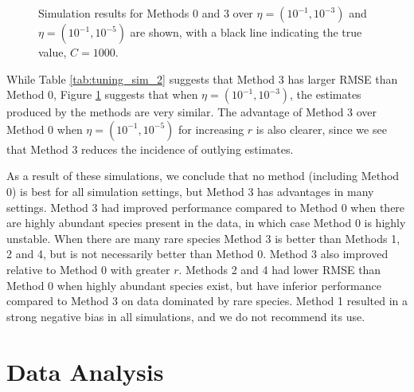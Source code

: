 \documentclass[12pt]{article}
\theoremstyle{break}
\theoremstyle{break}
\begin{document}
\begin{figure}[t]
\caption{Simulation results for Methods 0 and 3 over $\eta = (10^{-1}, 10^{-3})$ and $\eta = (10^{-1}, 10^{-5})$ are shown, with a black line indicating the true value, $C = 1000$.
\label{fig:tuning_sim_2}}
\centering{}
\end{figure}

While Table \ref{tab:tuning_sim_2} suggests that Method 3 has larger RMSE than Method 0, Figure \ref{fig:tuning_sim_2} suggests that when  $\eta = (10^{-1}, 10^{-3})$, the estimates produced by the methods are very similar. The advantage of Method 3 over Method 0 when $\eta = (10^{-1}, 10^{-5})$ for increasing $r$ is also clearer, since we see that Method 3 reduces the incidence of outlying estimates.


As a result of these simulations, we conclude that no method (including Method 0) is best for all simulation settings, but Method 3 has advantages in many settings. Method 3 had improved performance compared to Method 0 when there are highly abundant species present in the data, in which case Method 0 is highly unstable.  When there are many rare species Method 3 is better than Methods 1, 2 and 4, but is not necessarily better than Method 0.  Method 3 also improved relative to Method 0 with greater $r$.  Methods 2 and 4 had lower RMSE than Method 0 when highly abundant species exist, but have inferior performance compared to Method 3 on data dominated by rare species. Method 1 resulted in a strong negative bias in all simulations, and we do not recommend its use.

\section{Data Analysis}
\label{sec:data_analysis}
\end{document}
